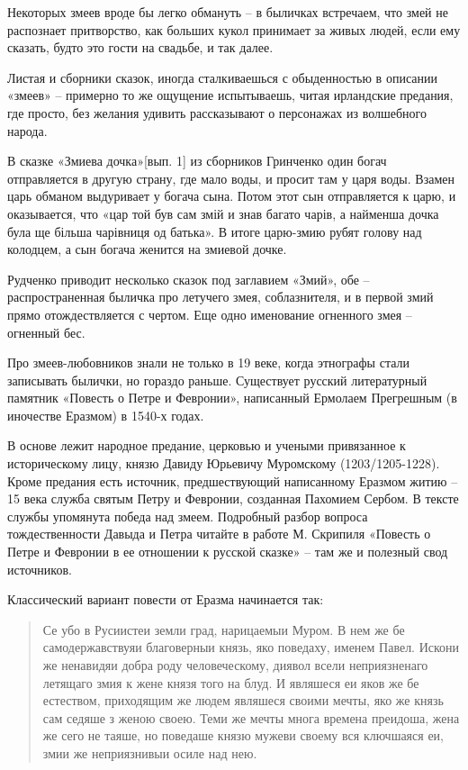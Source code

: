 Некоторых змеев вроде бы легко обмануть – в быличках встречаем, что змей не распознает притворство, как больших кукол принимает за живых людей, если ему сказать, будто это гости на свадьбе, и так далее.

Листая и сборники сказок, иногда сталкиваешься с обыденностью в описании «змеев» – примерно то же ощущение испытываешь, читая ирландские предания, где просто, без желания удивить рассказывают о персонажах из волшебного народа. 

В сказке «Змиева дочка»[вып. 1]\cite{grinetnochern} из сборников Гринченко один богач отправляется в другую страну, где мало воды, и просит там у царя воды. Взамен царь обманом выдуривает у богача сына. Потом этот сын отправляется к царю, и оказывается, что «цар той був сам змій и знав багато чарів, а найменша дочка була ще більша чарівниця од батька». В итоге царю-змию рубят голову над колодцем, а сын богача женится на змиевой дочке. 

Рудченко приводит\cite{rudskazki} несколько сказок под заглавием «Змий», обе – распространенная быличка про летучего змея, соблазнителя, и в первой змий прямо отождествляется с чертом. Еще одно именование огненного змея – огненный бес.

Про змеев-любовников знали не только в 19 веке, когда этнографы стали записывать былички, но гораздо раньше. Существует русский литературный памятник «Повесть о Петре и Февронии», написанный Ермолаем Прегрешным (в иночестве Еразмом) в 1540-х годах.

В основе лежит народное предание, церковью и учеными привязанное к историческому лицу, князю Давиду Юрьевичу Муромскому (1203/1205-1228).  Кроме предания есть источник, предшествующий написанному Еразмом житию – 15 века служба святым Петру и Февронии, созданная Пахомием Сербом. В тексте службы упомянута победа над змеем. Подробный разбор вопроса тождественности Давыда и Петра читайте в работе М. Скрипиля «Повесть о Петре и Февронии в ее отношении к русской сказке»\cite[том VII]{trudy-aknauk-otdel-drevsuslit} – там же и полезный свод источников.

Классический вариант повести от Еразма\cite[стр. 454-463]{izbornik01} начинается так:

\begin{quotation}
Се убо в Русиистеи земли град, нарицаемыи Муром. В нем же бе самодержавствуяи благоверныи князь, яко поведаху, именем Павел. Искони же ненавидяи добра роду человеческому, диявол всели неприязненаго летящаго змия к жене князя того на блуд. И являшеся еи яков же бе естеством, приходящим же людем являшеся своими мечты, яко же князь сам седяше з женою своею. Теми же мечты многа времена преидоша, жена же сего не таяше, но поведаше князю мужеви своему вся ключшаяся еи, змии же неприязнивыи осиле над нею.
\end{quotation}

